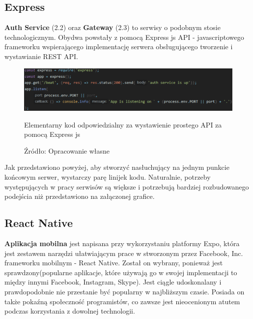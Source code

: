 \subsection{Express}
\textbf{Auth Service} (2.2) oraz \textbf{Gateway} (2.3) to serwisy o podobnym stosie technologicznym. Obydwa powstały z pomocą Express js API - javascriptowego frameworku wspierającego implementację serwera obsługującego tworzenie i wystawianie REST API.
\begin{figure}[H]
	\centering
	\includegraphics[width=\linewidth]{express_simple.pdf}
	\caption{\centering Elementarny kod odpowiedzialny za wystawienie prostego API za pomocą Express js}
	\caption*{\centering Źródło: {Opracowanie własne}}
\end{figure}
Jak przedstawiono powyżej, aby stworzyć nasłuchujący na jednym punkcie końcowym serwer, wystarczy parę linijek kodu. Naturalnie, potrzeby występujących w pracy serwisów są większe i potrzebują bardziej rozbudowanego podejścia niż przedstawiono na załączonej grafice.

\subsection{React Native}
\textbf{Aplikacja mobilna} jest napisana przy wykorzystaniu platformy Expo, która jest zestawem narzędzi ułatwiającym prace w stworzonym przez Facebook, Inc. frameworku mobilnym - React Native. Został on wybrany, ponieważ jest sprawdzony(popularne aplikacje, które używają go w swojej implementacji to między innymi Facebook, Instagram, Skype). Jest ciągle udoskonalany i prawdopodobnie nie przestanie być popularny w najbliższym czasie. Posiada on także pokaźną społeczność programistów, co zawsze jest nieocenionym atutem podczas korzystania z dowolnej technologii.

